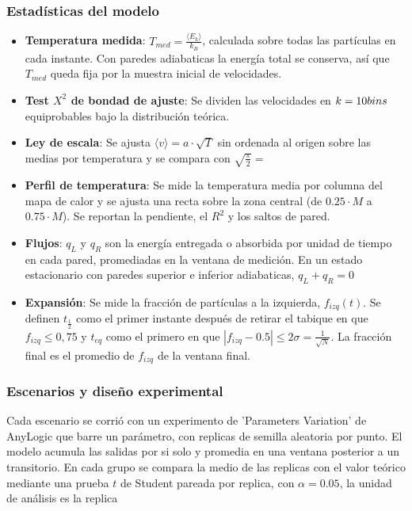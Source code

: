 \documentclass{article}
\begin{document}
\subsubsection{Estadísticas del modelo}
\begin{itemize}
    \item \textbf{Temperatura medida}: $T_{med}=\frac{\langle E_k \rangle}{k_B}$, calculada sobre todas las partículas en cada instante. Con paredes adiabaticas la energía total se conserva, así que $T_{med}$ queda fija por la muestra inicial de velocidades. 
    \item \textbf{Test $X^2$ de bondad de ajuste}: Se dividen las velocidades en $k=10\space bins$ equiprobables bajo la distribución teórica.
    \item \textbf{Ley de escala}: Se ajusta $\langle v \rangle=a\cdot\sqrt{T}$ sin ordenada al origen sobre las medias por temperatura y se compara con $\sqrt{\frac{\pi}{2}}=$
    \item \textbf{Perfil de temperatura}: Se mide la temperatura media por columna del mapa de calor y se ajusta una recta sobre la zona central (de $0.25\cdot M$ a $0.75\cdot M$). Se reportan la pendiente, el $R^2$ y los saltos de pared.
    \item \textbf{Flujos}: $q_L$ y $q_R$ son la energía entregada o absorbida por unidad de tiempo en cada pared, promediadas en la ventana de medición. En un estado estacionario con paredes superior e inferior adiabaticas, $q_L + q_R=0$
    \item \textbf{Expansión}: Se mide la fracción de partículas a la izquierda, $f_{izq}(t)$. Se definen $t_\frac{1}{2}$ como el primer instante después de retirar el tabique en que $f_{izq}\leq0,75$ y $t_{eq}$ como el primero en que $|f_{izq}-0.5|\leq 2\sigma=\frac{1}{\sqrt{N}}$. La fracción final es el promedio de $f_{izq}$ de la ventana final.
\end{itemize}

\subsubsection{Escenarios y diseño experimental}
Cada escenario se corrió con un experimento de 'Parameters Variation' de AnyLogic que barre un parámetro, con replicas de semilla aleatoria por punto. El modelo acumula las salidas por si solo y promedia en una ventana posterior a un transitorio. En cada grupo se compara la medio de las replicas con el valor teórico mediante una prueba $t$ de Student pareada por replica, con $\alpha=0.05$, la unidad de análisis es la replica
\end{document}
